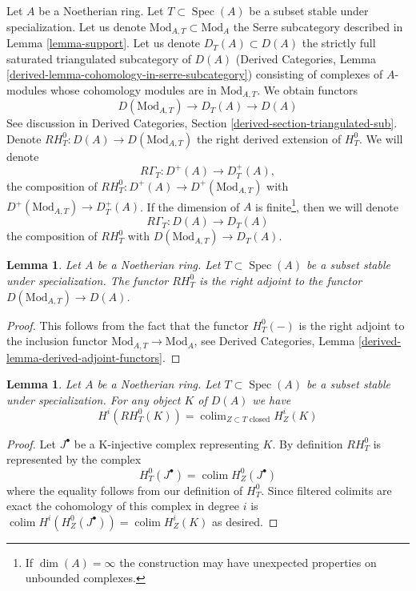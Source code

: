 \documentclass{stacks-project}
\theoremstyle{plain}
\newtheorem{lemma}[subsection]{Lemma}
\theoremstyle{definition}
\theoremstyle{remark}
\numberwithin{equation}{subsection}
\def\colim{\mathop{\mathrm{colim}}\nolimits}
\def\Spec{\mathop{\mathrm{Spec}}}
\begin{document}
\noindent
Let $A$ be a Noetherian ring. Let $T \subset \Spec(A)$ be a subset stable
under specialization. Let us denote $\text{Mod}_{A, T} \subset \text{Mod}_A$
the Serre subcategory described in Lemma \ref{lemma-support}.
Let us denote $D_T(A) \subset D(A)$ the
strictly full saturated triangulated subcategory of $D(A)$
(Derived Categories, Lemma \ref{derived-lemma-cohomology-in-serre-subcategory})
consisting of complexes of $A$-modules whose cohomology modules
are in $\text{Mod}_{A, T}$. We obtain functors
$$
D(\text{Mod}_{A, T}) \to D_T(A) \to D(A)
$$
See discussion in
Derived Categories, Section \ref{derived-section-triangulated-sub}.
Denote $RH^0_T : D(A) \to D(\text{Mod}_{A, T})$ the right
derived extension of $H^0_T$. We will denote
$$
R\Gamma_T : D^+(A) \to D^+_T(A),
$$
the composition of $RH^0_T : D^+(A) \to D^+(\text{Mod}_{A, T})$ with
$D^+(\text{Mod}_{A, T}) \to D^+_T(A)$. If the dimension of $A$ is
finite\footnote{If $\dim(A) = \infty$ the construction
may have unexpected properties on unbounded complexes.},
then we will denote
$$
R\Gamma_T : D(A) \to D_T(A)
$$
the composition of $RH^0_T$ with
$D(\text{Mod}_{A, T}) \to D_T(A)$.

\begin{lemma}
\label{lemma-adjoint}
Let $A$ be a Noetherian ring. Let $T \subset \Spec(A)$
be a subset stable under specialization. The functor
$RH^0_T$ is the right adjoint to the functor
$D(\text{Mod}_{A, T}) \to D(A)$.
\end{lemma}

\begin{proof}
This follows from the fact that the functor $H^0_T(-)$ is
the right adjoint to the inclusion functor
$\text{Mod}_{A, T} \to \text{Mod}_A$, see
Derived Categories, Lemma \ref{derived-lemma-derived-adjoint-functors}.
\end{proof}

\begin{lemma}
\label{lemma-adjoint-ext}
Let $A$ be a Noetherian ring. Let $T \subset \Spec(A)$
be a subset stable under specialization.
For any object $K$ of $D(A)$ we have
$$
H^i(RH^0_T(K)) = \colim_{Z \subset T\text{ closed}} H^i_Z(K)
$$
\end{lemma}

\begin{proof}
Let $J^\bullet$ be a K-injective complex representing $K$.
By definition $RH^0_T$ is represented by the complex
$$
H^0_T(J^\bullet) = \colim H^0_Z(J^\bullet)
$$
where the equality follows from our definition of $H^0_T$.
Since filtered colimits are exact the cohomology of this
complex in degree $i$ is
$\colim H^i(H^0_Z(J^\bullet)) = \colim H^i_Z(K)$
as desired.
\end{proof}
\end{document}
